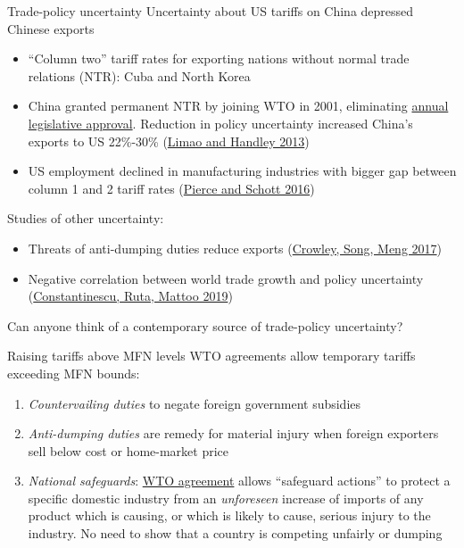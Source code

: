 \documentclass[11pt,notes=hide,aspectratio=169]{beamer}
\begin{document}
\begin{frame}{Trade-policy uncertainty}
Uncertainty about US tariffs on China depressed Chinese exports
\begin{itemize}
	\item ``Column two'' tariff rates for exporting nations without normal trade relations (NTR): Cuba and North Korea
	\item China granted permanent NTR by joining WTO in 2001, eliminating \href{https://www.youtube.com/watch?v=5dTuhJXDUOA}{annual legislative approval}.
	Reduction in policy uncertainty increased China's exports to US 22\%-30\% (\href{http://voxeu.org/article/does-policy-uncertainty-reduce-economic-activity}{Limao and Handley 2013})
	\item US employment declined in manufacturing industries with bigger gap between column 1 and 2 tariff rates (\href{http://www.aeaweb.org/articles?id=10.1257/aer.20131578}{Pierce and Schott 2016})
\end{itemize}
Studies of other uncertainty:
\begin{itemize}
	\item Threats of anti-dumping duties reduce exports {\small (\href{http://voxeu.org/article/protectionist-threats-jeopardise-international-trade}{Crowley, Song, Meng 2017})}
	\item Negative correlation between world trade growth and policy uncertainty {\small (\href{https://voxeu.org/content/how-policy-uncertainty-hurt-world-trade-2019}{Constantinescu, Ruta,  Mattoo 2019})}
\end{itemize}
Can anyone think of a contemporary source of trade-policy uncertainty?
\end{frame}
\begin{frame}{Raising tariffs above MFN levels}
WTO agreements allow temporary tariffs exceeding MFN bounds:
\begin{enumerate}
	\item \textit{Countervailing duties} to negate foreign government subsidies
	\item \textit{Anti-dumping duties} are remedy for material injury when foreign exporters sell below cost or home-market price
	\item \textit{National safeguards}: \href{https://www.wto.org/english/tratop_e/safeg_e/safeg_info_e.htm}{WTO agreement} allows ``safeguard actions'' to protect a specific domestic industry from an \textit{unforeseen} increase of imports of any product which is causing, or which is likely to cause, serious injury to the industry.
	No need to show that a country is competing unfairly or dumping
\end{enumerate}
\end{frame}
\end{document}
